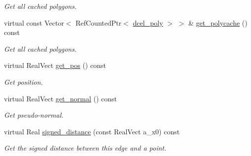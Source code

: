 \begin{DoxyCompactItemize}
\begin{DoxyCompactList}\small\item\em Get all cached polygons. \end{DoxyCompactList}\item 
virtual const Vector$<$ Ref\+Counted\+Ptr$<$ \hyperlink{classdcel__poly}{dcel\+\_\+poly} $>$ $>$ \& \hyperlink{classdcel__vert_aeb250a2ad29020152f9f7ff352167ab7}{get\+\_\+polycache} () const 
\begin{DoxyCompactList}\small\item\em Get all cached polygons. \end{DoxyCompactList}\item 
virtual Real\+Vect \hyperlink{classdcel__vert_adf242722a5c927d173bf75c301fc908c}{get\+\_\+pos} () const 
\begin{DoxyCompactList}\small\item\em Get position. \end{DoxyCompactList}\item 
virtual Real\+Vect \hyperlink{classdcel__vert_a9d4b513719717ffb6a3b638e303a49d9}{get\+\_\+normal} () const 
\begin{DoxyCompactList}\small\item\em Get pseudo-\/normal. \end{DoxyCompactList}\item 
virtual Real \hyperlink{classdcel__vert_a5207f40722d076bfd44f35152a10f7a9}{signed\+\_\+distance} (const Real\+Vect a\+\_\+x0) const 
\begin{DoxyCompactList}\small\item\em Get the signed distance between this edge and a point. \end{DoxyCompactList}\end{DoxyCompactItemize}

